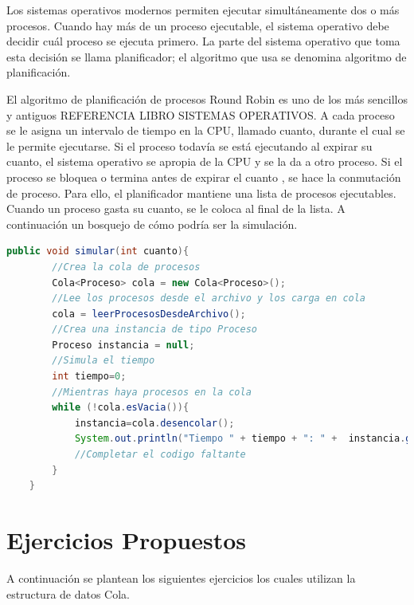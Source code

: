 Los sistemas operativos modernos permiten ejecutar simultáneamente dos o más procesos.  Cuando hay más de un proceso ejecutable, el sistema operativo debe decidir cuál proceso se ejecuta primero. La parte del sistema operativo que toma esta decisión se llama planificador; el algoritmo que usa se denomina algoritmo de planificación.  

El algoritmo de planificación de procesos Round Robin es uno de los más sencillos y antiguos REFERENCIA LIBRO SISTEMAS OPERATIVOS. A cada proceso se le asigna un intervalo de tiempo en la CPU, llamado cuanto, durante el cual se le permite ejecutarse. Si el proceso todavía se está ejecutando al expirar su cuanto, el sistema operativo se apropia de la CPU y se la da a otro proceso. Si el proceso se bloquea o termina antes de expirar el cuanto , se hace la conmutación de proceso. Para ello, el planificador mantiene una lista de procesos ejecutables. Cuando un proceso gasta su cuanto, se le coloca al final de la lista. A continuación un bosquejo de cómo podría ser la simulación.

\begin{lstlisting}[language=Java]
	public void simular(int cuanto){
		//Crea la cola de procesos
		Cola<Proceso> cola = new Cola<Proceso>();
		//Lee los procesos desde el archivo y los carga en cola
		cola = leerProcesosDesdeArchivo();
		//Crea una instancia de tipo Proceso
		Proceso instancia = null;
		//Simula el tiempo
		int tiempo=0;
		//Mientras haya procesos en la cola
	    while (!cola.esVacia()){
			instancia=cola.desencolar();
			System.out.println("Tiempo " + tiempo + ": " +  instancia.getId() + " entra a ejecucion);
			//Completar el codigo faltante
		}
	}
\end{lstlisting}

\section{Ejercicios Propuestos}
A continuación se plantean los siguientes ejercicios los cuales utilizan la estructura de datos Cola.

